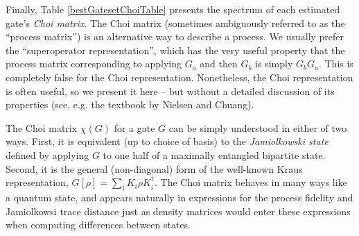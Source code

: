 \documentclass{article}[11pt]
\begin{document}



Finally, Table \ref{bestGatesetChoiTable} presents the spectrum of each estimated gate's \emph{Choi matrix}.  The Choi matrix (sometimes ambiguously referred to as the ``process matrix'') is an alternative way to describe a process.  We usually prefer the ``superoperator representation'', which has the very useful property that the process matrix corresponding to applying $G_a$ and then $G_b$ is simply $G_bG_a$.  This is completely false for the Choi representation.  Nonetheless, the Choi representation is often useful, so we present it here -- but without a detailed discussion of its properties (see, e.g. the textbook by Nielsen and Chuang).

The Choi matrix $\chi(G)$ for a gate $G$ can be simply understood in either of two ways.  First, it is equivalent (up to choice of basis) to the \emph{Jamiolkowski state} defined by applying $G$ to one half of a maximally entangled bipartite state.  Second, it is the general (non-diagonal) form of the well-known Kraus representation, $G[\rho] = \sum_i{K_i\rho K_i^\dagger}$.  The Choi matrix behaves in many ways like a quantum state, and appears naturally in expressions for the process fidelity and Jamiolkowsi trace distance just as density matrices would enter these expressions when computing differences between states.  
\end{document}
